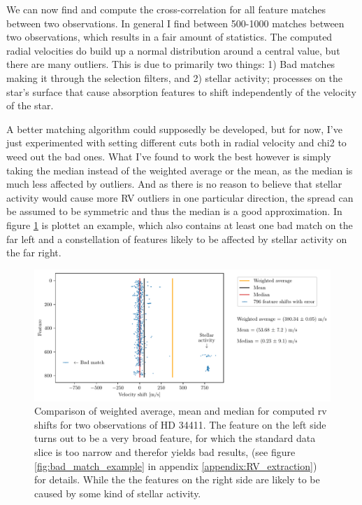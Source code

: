     We can now find and compute the cross-correlation for all feature matches between two observations. In general I find between 500-1000 matches between two observations, which results in a fair amount of statistics. The computed radial velocities do build up a normal distribution around a central value, but there are many outliers. This is due to primarily two things: 1) Bad matches making it through the selection filters, and 2) stellar activity; processes on the star's surface that cause absorption features to shift independently of the velocity of the star. 
    
    A better matching algorithm could supposedly be developed, but for now, I've just experimented with setting different cuts both in radial velocity and chi2 to weed out the bad ones. What I've found to work the best however is simply taking the median instead of the weighted average or the mean, as the median is much less affected by outliers. And as there is no reason to believe that stellar activity would cause more RV outliers in one particular direction, the spread can be assumed to be symmetric and thus the median is a good approximation. In figure \ref{fig:median-mean-weighted-average} is plottet an example, which also contains at least one bad match on the far left and a constellation of features likely to be affected by stellar activity on the far right.

    \begin{figure}%
        \begin{wide}  
            \includegraphics[width=\textwidth]{figures/median-mean-weighted.pdf}
            \caption{Comparison of weighted average, mean and median for computed rv shifts for two observations of HD 34411. The feature on the left side turns out to be a very broad feature, for which the standard data slice is too narrow and therefor yields bad results, (see figure \ref{fig:bad_match_example} in appendix \ref{appendix:RV_extraction}) for details. While the the features on the right side are likely to be caused by some kind of stellar activity.}
        \label{fig:median-mean-weighted-average}
        \end{wide}
    \end{figure}

